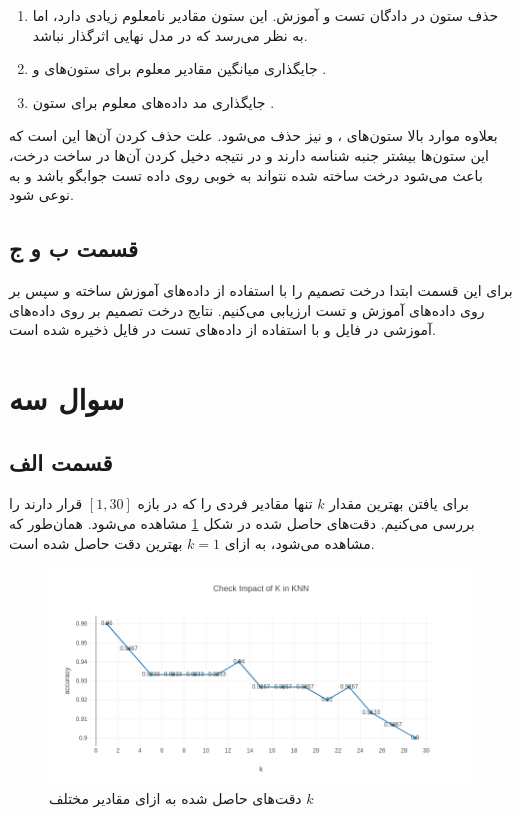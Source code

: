 \documentclass{article}
\begin{document}
\begin{enumerate}
    \item حذف ستون  در دادگان تست و آموزش. این ستون مقادیر نامعلوم زیادی دارد، اما
    به نظر می‌رسد که در مدل نهایی اثرگذار نباشد.
    \item جایگذاری میانگین مقادیر معلوم برای ستون‌های  و .
    \item جایگذاری مد داده‌های معلوم برای ستون .
\end{enumerate}

بعلاوه موارد بالا ستون‌های ،  و  نیز حذف می‌شود.
علت حذف کردن آن‌ها این است که این ستون‌ها بیشتر جنبه شناسه دارند و در نتیجه دخیل کردن آن‌ها در
ساخت درخت، باعث می‌شود درخت ساخته شده نتواند به خوبی روی داده تست جوابگو باشد و به نوعی 
شود.

\subsection*{قسمت ب و ج}

برای این قسمت ابتدا درخت تصمیم را با استفاده از داده‌های آموزش ساخته و سپس بر روی داده‌های آموزش و
تست ارزیابی می‌کنیم. نتایج درخت تصمیم بر روی داده‌های آموزشی در فایل 
و با استفاده از داده‌های تست در فایل  ذخیره شده است.

\section*{سوال سه}

\subsection*{قسمت الف}

برای یافتن بهترین مقدار $k$ تنها مقادیر فردی را که در بازه $[1,30]$ قرار دارند را بررسی می‌کنیم.
دقت‌های حاصل شده در شکل \ref{implementation-question1-parta} مشاهده می‌شود. همان‌طور که مشاهده می‌شود،
به ازای $k=1$ بهترین دقت حاصل شده است.


\begin{figure}[h]
    \centering
    \includegraphics[width=\linewidth]{images/implementation/q1/parta.png}
    \caption{دقت‌های حاصل شده به ازای مقادیر مختلف $k$}
    \label{implementation-question1-parta}
\end{figure}
\end{document}
